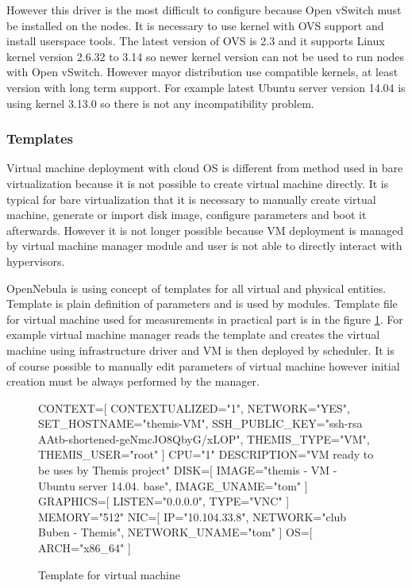 However this driver is the most difficult to configure because Open vSwitch must be installed on the nodes. It is necessary to use kernel with \Ac{OVS} support and install userspace tools. The latest version of \Ac{OVS} is 2.3 and it supports Linux kernel version 2.6.32 to 3.14 so newer kernel version can not be used to run nodes with Open vSwitch. However mayor distribution use compatible kernels, at least version with long term support. For example latest Ubuntu server version 14.04 is using kernel 3.13.0 so there is not any incompatibility problem.

\subsubsection{Templates}
Virtual machine deployment with cloud \Ac{OS} is different from method used in bare virtualization because it is not possible to create virtual machine directly. It is typical for bare virtualization that it is necessary to manually create virtual machine, generate or import disk image, configure parameters and boot it afterwards. However it is not longer possible because \Ac{VM} deployment is managed by virtual machine manager module and user is not able to directly interact with hypervisors. 

OpenNebula is using concept of templates for all virtual and physical entities. Template is plain definition of parameters and is used by modules. Template file for virtual machine used for measurements in practical part is in the figure \ref{code:template}. For example virtual machine manager reads the template and creates the virtual machine using infrastructure driver and \Ac{VM} is then deployed by scheduler. It is of course possible to manually edit parameters of virtual machine however initial creation must be always performed by the manager.

\begin{figure}[htb]
\caption{Template for virtual machine}
\label{code:template}
\begin{verbatimtab}
CONTEXT=[
	CONTEXTUALIZED="1",
	NETWORK="YES",
	SET_HOSTNAME="themis-VM",
	SSH_PUBLIC_KEY="ssh-rsa AAtb-shortened-geNmcJO8QbyG/xLOP",
	THEMIS_TYPE="VM",
	THEMIS_USER="root"
	]
CPU="1"
DESCRIPTION="VM ready to be uses by Themis project"
DISK=[
	IMAGE="themis - VM - Ubuntu server 14.04. base",
	IMAGE_UNAME="tom"
	]
GRAPHICS=[
	LISTEN="0.0.0.0",
	TYPE="VNC"
	]
MEMORY="512"
NIC=[
	IP="10.104.33.8",
	NETWORK="club Buben - Themis",
	NETWORK_UNAME="tom"
	]
OS=[
	ARCH="x86_64"
	]
\end{verbatimtab}
\end{figure}

